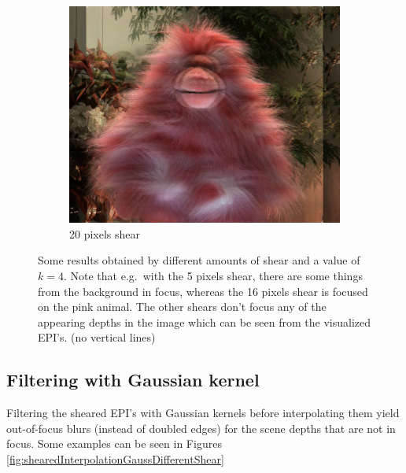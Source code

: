 \documentclass[a4paper]{article}
\begin{document}
\begin{figure}[ht]
\begin{subfigure}[h]{0.48\textwidth}
	  \vspace{2mm}
	  \includegraphics[width=\textwidth]{ShearedInterpolation58_62_shear20}
	  \caption*{20 pixels shear}
	\end{subfigure}
\caption{Some results obtained by different amounts of shear and a value of $k=4$. Note that e.g.\ with the 5 pixels shear, there are some things from the background in focus, whereas the 16 pixels shear is focused on the pink animal. The other shears don't focus any of the appearing depths in the image which can be seen from the visualized EPI's. (no vertical lines)}
\label{fig:shearedInterpolationDifferentShear}
\end{figure}

\subsection*{Filtering with Gaussian kernel}
Filtering the sheared EPI's with Gaussian kernels before interpolating them yield out-of-focus blurs (instead of doubled edges) for the scene depths that are not in focus. Some examples can be seen in Figures \ref{fig:shearedInterpolationGaussDifferentShear} 
\end{document}
